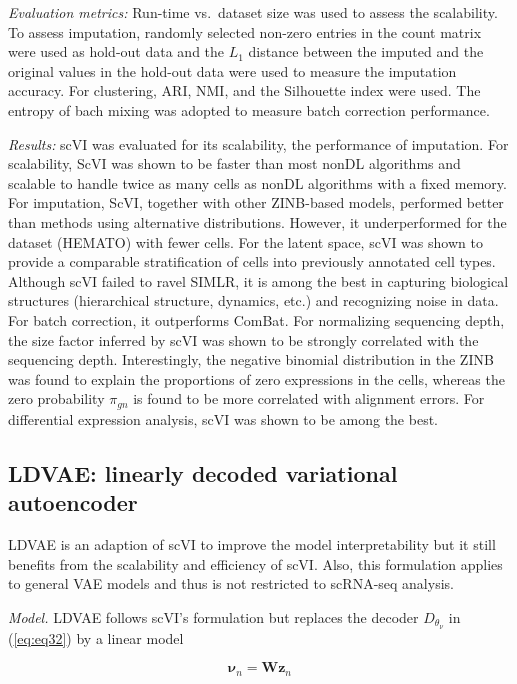 \documentclass[
]{book}
\begin{document}
\emph{Evaluation metrics:} Run-time vs.~dataset size was used to assess the scalability. To assess imputation, randomly selected non-zero entries in the count matrix were used as hold-out data and the \(L_{1}\) distance between the imputed and the original values in the hold-out data were used to measure the imputation accuracy. For clustering, ARI, NMI, and the Silhouette index were used. The entropy of bach mixing was adopted to measure batch correction performance.

\emph{Results:} scVI was evaluated for its scalability, the performance of imputation. For scalability, ScVI was shown to be faster than most nonDL algorithms and scalable to handle twice as many cells as nonDL algorithms with a fixed memory. For imputation, ScVI, together with other ZINB-based models, performed better than methods using alternative distributions. However, it underperformed for the dataset (HEMATO) with fewer cells. For the latent space, scVI was shown to provide a comparable stratification of cells into previously annotated cell types. Although scVI failed to ravel SIMLR, it is among the best in capturing biological structures (hierarchical structure, dynamics, etc.) and recognizing noise in data. For batch correction, it outperforms ComBat. For normalizing sequencing depth, the size factor inferred by scVI was shown to be strongly correlated with the sequencing depth. Interestingly, the negative binomial distribution in the ZINB was found to explain the proportions of zero expressions in the cells, whereas the zero probability \(\pi_{gn}\) is found to be more correlated with alignment errors. For differential expression analysis, scVI was shown to be among the best.

\hypertarget{ch-5-4-2}{%
\subsection{LDVAE: linearly decoded variational autoencoder}\label{ch-5-4-2}}

LDVAE \citep{RN143} is an adaption of scVI to improve the model interpretability but it still benefits from the scalability and efficiency of scVI. Also, this formulation applies to general VAE models and thus is not restricted to scRNA-seq analysis.

\emph{Model.} LDVAE follows scVI's formulation but replaces the decoder \(D_{\theta_{ν}}\) in (\eqref{eq:eq32}) by a linear model

\begin{equation}
    \mathbf{ν}_{n}=\mathbf{Wz}_{n}  \label{eq:eq35}
\end{equation}
\end{document}
